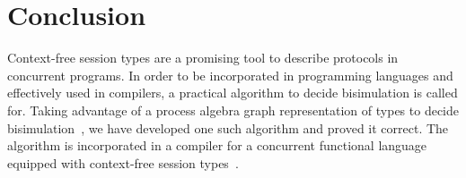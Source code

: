 \section{Conclusion}
\label{sec:conclusion}

Context-free session types are a promising tool to describe protocols
in concurrent programs. In order to be incorporated in programming
languages and effectively used in compilers, a practical algorithm to
decide bisimulation is called for.
%
Taking advantage of a process algebra graph representation of types to
decide
bisimulation~\cite{DBLP:journals/tcs/HirshfeldJM96,DBLP:conf/concur/HirshfeldM94},
we have developed one such algorithm and proved it correct. The
algorithm is incorporated in a compiler for a concurrent functional
language equipped with context-free session
types~\cite{almeida.etal_freest-functional-language}.


